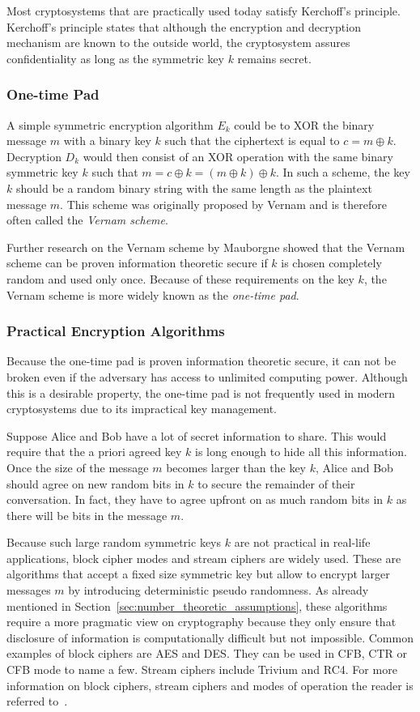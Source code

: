 Most cryptosystems that are practically used today satisfy Kerchoff's principle. Kerchoff's principle states that although the encryption and decryption mechanism are known to the outside world, the cryptosystem assures confidentiality as long as the symmetric key $k$ remains secret.

\subsubsection{One-time Pad}
A simple symmetric encryption algorithm $E_k$ could be to XOR the binary message $m$ with a binary key $k$ such that the ciphertext is equal to $c = m \oplus k$. Decryption $D_k$ would then consist of an XOR operation with the same binary symmetric key $k$ such that $m = c \oplus k = \left( m \oplus k \right) \oplus k$.  In such a scheme, the key $k$ should be a random binary string with the same length as the plaintext message $m$. This scheme was originally proposed by Vernam and is therefore often called the \textit{Vernam scheme}.

Further research on the Vernam scheme by Mauborgne showed that the Vernam scheme can be proven information theoretic secure if $k$ is chosen completely random and used only once. Because of these requirements on the key $k$, the Vernam scheme is more widely known as the \textit{one-time pad}.

\subsubsection{Practical Encryption Algorithms}
Because the one-time pad is proven information theoretic secure, it can not be broken even if the adversary has access to unlimited computing power. Although this is a desirable property, the one-time pad is not frequently used in modern cryptosystems due to its impractical key management.

Suppose Alice and Bob have a lot of secret information to share. This would require that the a priori agreed key $k$ is long enough to hide all this information. Once the size of the message $m$ becomes larger than the key $k$, Alice and Bob should agree on new random bits in $k$ to secure the remainder of their conversation. In fact, they have to agree upfront on as much random bits in $k$ as there will be bits in the message $m$.

Because such large random symmetric keys $k$ are not practical in real-life applications, block cipher modes and stream ciphers are widely used. These are algorithms that accept a fixed size symmetric key but allow to encrypt larger messages $m$ by introducing deterministic pseudo randomness. As already mentioned in Section~\ref{sec:number_theoretic_assumptions}, these algorithms require a more pragmatic view on cryptography because they only ensure that disclosure of information is computationally difficult but not impossible. Common examples of block ciphers are AES and DES. They can be used in CFB, CTR or CFB mode to name a few. Stream ciphers include Trivium and RC4. For more information on block ciphers, stream ciphers and modes of operation the reader is referred to~\cite{book:handbook_of_applied_cryptography}.

